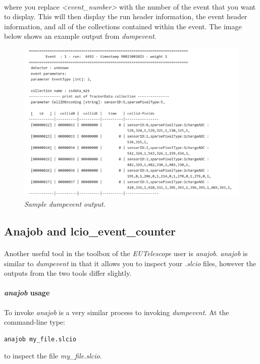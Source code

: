 \documentclass[11pt]{article}
\begin{document}
\paragraph{}
where you replace \textit{\textless event\_number\textgreater} with the number of the event that you want to display. This will then display the run header information, the event header information, and all of the collections contained within the event. The image below shows an example output from \textit{dumpevent}.
\pagebreak
\begin{figure}[!ht]
	\centering
	\includegraphics[scale=0.4]{images/dumpevent.png}
	\caption{\textit{Sample dumpevent output.}}
\end{figure}

\subsection{Anajob and lcio\_event\_counter}
\paragraph{}
Another useful tool in the toolbox of the \textit{EUTelescope} user is \textit{anajob}. \textit{anajob} is similar to \textit{dumpevent} in that it allows you to inspect your \textit{.slcio} files, however the outputs from the two tools differ slightly.
\paragraph{\textit{anajob} usage}
To invoke \textit{anajob} is a very similar process to invoking \textit{dumpevent}. At the command-line type:
\begin{verbatim}
anajob my_file.slcio
\end{verbatim}
to inspect the file \textit{my\_file.slcio}.
\end{document}
